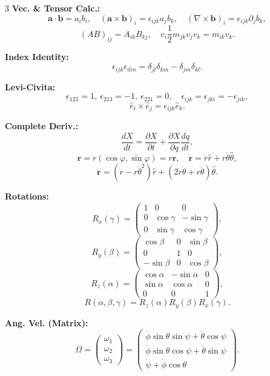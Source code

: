 \documentclass[1pt]{article}
\begin{document}
\begin{multicols}{3}
\textbf{Vec. \& Tensor Calc.:} 
\[
\mathbf{a}\cdot\mathbf{b}=a_ib_i,\quad
(\mathbf{a}\times\mathbf{b})_i=\epsilon_{ijk}a_jb_k,\quad
(\nabla\times\mathbf{b})_i=\epsilon_{ijk}\partial_jb_k,
\]
\[
(AB)_{ij}=A_{ik}B_{kj},\quad
v_i\frac{1}{2}m_{jk}v_jv_k=m_{ik}v_k.
\]

\textbf{Index Identity:} 
\[
\epsilon_{ijk}\epsilon_{ilm}=\delta_{jl}\delta_{km}-\delta_{jm}\delta_{kl}.
\]

\textbf{Levi-Civita:} 
\[
\epsilon_{123}=1,\ \epsilon_{213}=-1,\ \epsilon_{221}=0,\quad
\epsilon_{ijk}=\epsilon_{jki}=-\epsilon_{jik},
\]
\[
\hat{e}_i\times\hat{e}_j=\epsilon_{ijk}\hat{e}_k.
\]

\textbf{Complete Deriv.:} 
\[
\frac{dX}{dt}=\frac{\partial X}{\partial t}+\frac{\partial X}{\partial q}\frac{dq}{dt},
\]
\[
\mathbf{r}=r(\cos\varphi,\sin\varphi)=r\hat{\mathbf{r}},\quad
\dot{\mathbf{r}}=\dot{r}\hat{r}+r\dot{\theta}\hat{\theta},
\]
\[
\ddot{\mathbf{r}}=(\ddot{r}-r\dot{\theta}^2)\hat{r}+(2\dot{r}\dot{\theta}+r\ddot{\theta})\hat{\theta}.
\]

\textbf{Rotations:}
\[
R_x(\gamma)=\begin{pmatrix} 1&0&0\\0&\cos\gamma&-\sin\gamma\\0&\sin\gamma&\cos\gamma \end{pmatrix},
\]
\[
R_y(\beta)=\begin{pmatrix}\cos\beta&0&\sin\beta\\0&1&0\\-\sin\beta&0&\cos\beta\end{pmatrix},
\]
\[
R_z(\alpha)=\begin{pmatrix}\cos\alpha&-\sin\alpha&0\\\sin\alpha&\cos\alpha&0\\0&0&1\end{pmatrix},
\]
\[
R(\alpha,\beta,\gamma)=R_z(\alpha)R_y(\beta)R_x(\gamma).
\]

\textbf{Ang. Vel. (Matrix):}
\[
\Omega=\begin{pmatrix}\omega_1\\\omega_2\\\omega_3\end{pmatrix}
=\begin{pmatrix}\dot{\phi}\sin\theta\sin\psi+\dot{\theta}\cos\psi\\ \dot{\phi}\sin\theta\cos\psi+\dot{\theta}\sin\psi\\ \dot{\psi}+\dot{\phi}\cos\theta\end{pmatrix}.
\]


\end{multicols}
\end{document}
